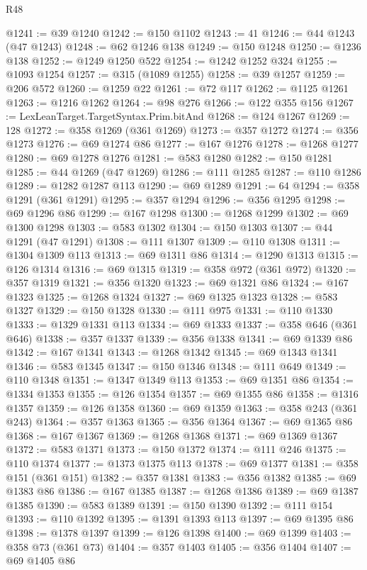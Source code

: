 \begin{lexlean}{R48}
\begin{coremodule}
@1241 := @39 @1240
@1242 := @150 @1102
@1243 := 41
@1246 := @44 @1243 (@47 @1243)
@1248 := @62 @1246 @138
@1249 := @150 @1248
@1250 := @1236 @138
@1252 := @1249 @1250 @522
@1254 := @1242 @1252 @324
@1255 := @1093 @1254
@1257 := @315 (@1089 @1255)
@1258 := @39 @1257
@1259 := @206 @572
@1260 := @1259 @22
@1261 := @72 @117
@1262 := @1125 @1261
@1263 := @1216 @1262
@1264 := @98 @276
@1266 := @122 @355 @156
@1267 := LexLeanTarget.TargetSyntax.Prim.bitAnd
@1268 := @124 @1267
@1269 := 128
@1272 := @358 @1269 (@361 @1269)
@1273 := @357 @1272
@1274 := @356 @1273
@1276 := @69 @1274 @86
@1277 := @167 @1276
@1278 := @1268 @1277
@1280 := @69 @1278 @1276
@1281 := @583 @1280
@1282 := @150 @1281
@1285 := @44 @1269 (@47 @1269)
@1286 := @111 @1285
@1287 := @110 @1286
@1289 := @1282 @1287 @113
@1290 := @69 @1289
@1291 := 64
@1294 := @358 @1291 (@361 @1291)
@1295 := @357 @1294
@1296 := @356 @1295
@1298 := @69 @1296 @86
@1299 := @167 @1298
@1300 := @1268 @1299
@1302 := @69 @1300 @1298
@1303 := @583 @1302
@1304 := @150 @1303
@1307 := @44 @1291 (@47 @1291)
@1308 := @111 @1307
@1309 := @110 @1308
@1311 := @1304 @1309 @113
@1313 := @69 @1311 @86
@1314 := @1290 @1313
@1315 := @126 @1314
@1316 := @69 @1315
@1319 := @358 @972 (@361 @972)
@1320 := @357 @1319
@1321 := @356 @1320
@1323 := @69 @1321 @86
@1324 := @167 @1323
@1325 := @1268 @1324
@1327 := @69 @1325 @1323
@1328 := @583 @1327
@1329 := @150 @1328
@1330 := @111 @975
@1331 := @110 @1330
@1333 := @1329 @1331 @113
@1334 := @69 @1333
@1337 := @358 @646 (@361 @646)
@1338 := @357 @1337
@1339 := @356 @1338
@1341 := @69 @1339 @86
@1342 := @167 @1341
@1343 := @1268 @1342
@1345 := @69 @1343 @1341
@1346 := @583 @1345
@1347 := @150 @1346
@1348 := @111 @649
@1349 := @110 @1348
@1351 := @1347 @1349 @113
@1353 := @69 @1351 @86
@1354 := @1334 @1353
@1355 := @126 @1354
@1357 := @69 @1355 @86
@1358 := @1316 @1357
@1359 := @126 @1358
@1360 := @69 @1359
@1363 := @358 @243 (@361 @243)
@1364 := @357 @1363
@1365 := @356 @1364
@1367 := @69 @1365 @86
@1368 := @167 @1367
@1369 := @1268 @1368
@1371 := @69 @1369 @1367
@1372 := @583 @1371
@1373 := @150 @1372
@1374 := @111 @246
@1375 := @110 @1374
@1377 := @1373 @1375 @113
@1378 := @69 @1377
@1381 := @358 @151 (@361 @151)
@1382 := @357 @1381
@1383 := @356 @1382
@1385 := @69 @1383 @86
@1386 := @167 @1385
@1387 := @1268 @1386
@1389 := @69 @1387 @1385
@1390 := @583 @1389
@1391 := @150 @1390
@1392 := @111 @154
@1393 := @110 @1392
@1395 := @1391 @1393 @113
@1397 := @69 @1395 @86
@1398 := @1378 @1397
@1399 := @126 @1398
@1400 := @69 @1399
@1403 := @358 @73 (@361 @73)
@1404 := @357 @1403
@1405 := @356 @1404
@1407 := @69 @1405 @86

\end{coremodule}
\end{lexlean}
